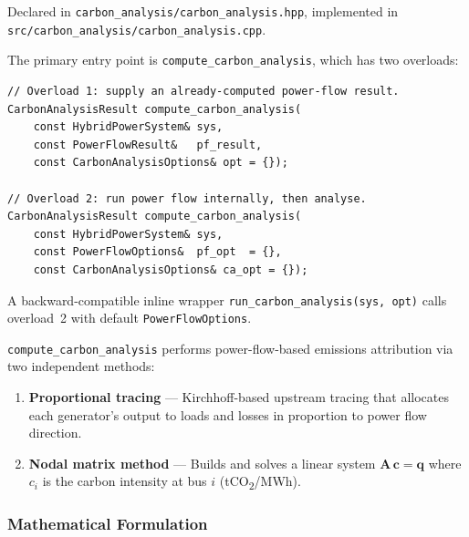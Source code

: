Declared in \texttt{carbon\_analysis/carbon\_analysis.hpp},
implemented in \texttt{src/carbon\_analysis/carbon\_analysis.cpp}.

The primary entry point is \texttt{compute\_carbon\_analysis}, which has two
overloads:
\begin{verbatim}
// Overload 1: supply an already-computed power-flow result.
CarbonAnalysisResult compute_carbon_analysis(
    const HybridPowerSystem& sys,
    const PowerFlowResult&   pf_result,
    const CarbonAnalysisOptions& opt = {});

// Overload 2: run power flow internally, then analyse.
CarbonAnalysisResult compute_carbon_analysis(
    const HybridPowerSystem& sys,
    const PowerFlowOptions&  pf_opt  = {},
    const CarbonAnalysisOptions& ca_opt = {});
\end{verbatim}
A backward-compatible inline wrapper \texttt{run\_carbon\_analysis(sys, opt)}
calls overload~2 with default \texttt{PowerFlowOptions}.

\texttt{compute\_carbon\_analysis} performs power-flow-based emissions
attribution via two independent methods:
\begin{enumerate}
  \item \textbf{Proportional tracing} --- Kirchhoff-based upstream tracing that
        allocates each generator's output to loads and losses in proportion to
        power flow direction.
  \item \textbf{Nodal matrix method} --- Builds and solves a linear system
        $\mathbf{A}\,\mathbf{c} = \mathbf{q}$ where $c_i$ is the carbon
        intensity at bus $i$ (tCO\textsubscript{2}/MWh).
\end{enumerate}

\subsubsection{Mathematical Formulation}

